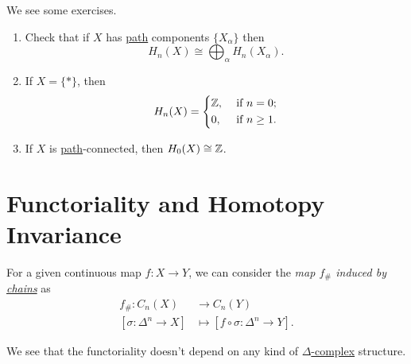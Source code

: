 \begin{exercise}
	We see some exercises.
	\begin{enumerate}
		\item Check that if \(X\) has \hyperref[def:path]{path} components \(\{X_\alpha\}\) then
		      \[
			      H_n(X) \cong \bigoplus_\alpha H_n(X_\alpha).
		      \]
		\item If \(X = \{\ast\}\), then
		      \[
			      H_n(X) = \begin{dcases}
				      \mathbb{\MakeUppercase{z}}, & \text{ if } n=0 ;     \\
				      0,                          & \text{ if } n\geq 1 .
			      \end{dcases}
		      \]
		\item If \(X\) is \hyperref[def:path]{path}-connected, then \(H_0(X) \cong \mathbb{\MakeUppercase{z}}\).
	\end{enumerate}

\end{exercise}

\section{Functoriality and Homotopy Invariance}
\begin{definition}\label{def:induced-map-on-chains}
	For a given continuous map \(f \colon X \to Y\), we can consider the \emph{map \(f_{\#}\) induced by \hyperref[def:chain-complex]{chains}} as
	\[
		\begin{split}
			f_{\#} \colon C_n(X)           & \to C_n(Y)                                      \\
			[\sigma \colon \Delta^n \to X] & \mapsto [f \circ \sigma \colon \Delta^n \to Y].
		\end{split}
	\]
\end{definition}
\begin{remark}
	We see that the functoriality doesn't depend on any kind of \hyperref[def:delta-complex]{\(\Delta \)-complex} structure.
\end{remark}

